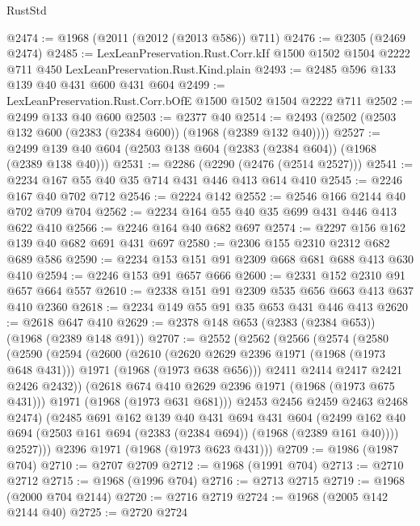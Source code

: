 \begin{lexlean}{RustStd}
\begin{coremodule}
{\begin{coremodule}
{{{{{@2474 := @1968 (@2011 (@2012 (@2013 @586)) @711)
@2476 := @2305 (@2469 @2474)
@2485 := LexLeanPreservation.Rust.Corr.kIf
    @1500
    @1502
    @1504
    @2222
    @711
    @450
    LexLeanPreservation.Rust.Kind.plain
@2493 := @2485 @596 @133 @139 @40 @431 @600 @431 @604
@2499 := LexLeanPreservation.Rust.Corr.bOfE @1500 @1502 @1504 @2222 @711
@2502 := @2499 @133 @40 @600
@2503 := @2377 @40
@2514 := @2493 (@2502 (@2503 @132 @600 (@2383 (@2384 @600)) (@1968 (@2389 @132 @40))))
@2527 := @2499 @139 @40 @604 (@2503 @138 @604 (@2383 (@2384 @604)) (@1968 (@2389 @138 @40)))
@2531 := @2286 (@2290 (@2476 (@2514 @2527)))
@2541 := @2234 @167 @55 @40 @35 @714 @431 @446 @413 @614 @410
@2545 := @2246 @167 @40 @702 @712
@2546 := @2224 @142
@2552 := @2546 @166 @2144 @40 @702 @709 @704
@2562 := @2234 @164 @55 @40 @35 @699 @431 @446 @413 @622 @410
@2566 := @2246 @164 @40 @682 @697
@2574 := @2297 @156 @162 @139 @40 @682 @691 @431 @697
@2580 := @2306 @155 @2310 @2312 @682 @689 @586
@2590 := @2234 @153 @151 @91 @2309 @668 @681 @688 @413 @630 @410
@2594 := @2246 @153 @91 @657 @666
@2600 := @2331 @152 @2310 @91 @657 @664 @557
@2610 := @2338 @151 @91 @2309 @535 @656 @663 @413 @637 @410 @2360
@2618 := @2234 @149 @55 @91 @35 @653 @431 @446 @413
@2620 := @2618 @647 @410
@2629 := @2378 @148 @653 (@2383 (@2384 @653)) (@1968 (@2389 @148 @91))
@2707 := @2552
    (@2562
      (@2566
        (@2574
          (@2580
            (@2590
              (@2594
                (@2600
                  (@2610
                    (@2620 @2629 @2396 @1971 (@1968 (@1973 @648 @431)))
                    @1971
                    (@1968 (@1973 @638 @656)))
                  @2411
                  @2414
                  @2417
                  @2421
                  @2426
                  @2432))
              (@2618 @674 @410 @2629 @2396 @1971 (@1968 (@1973 @675 @431)))
              @1971
              (@1968 (@1973 @631 @681)))
            @2453
            @2456
            @2459
            @2463
            @2468
            @2474)
          (@2485
            @691
            @162
            @139
            @40
            @431
            @694
            @431
            @604
            (@2499 @162 @40 @694 (@2503 @161 @694 (@2383 (@2384 @694)) (@1968 (@2389 @161 @40))))
            @2527)))
      @2396
      @1971
      (@1968 (@1973 @623 @431)))
@2709 := @1986 (@1987 @704)
@2710 := @2707 @2709
@2712 := @1968 (@1991 @704)
@2713 := @2710 @2712
@2715 := @1968 (@1996 @704)
@2716 := @2713 @2715
@2719 := @1968 (@2000 @704 @2144)
@2720 := @2716 @2719
@2724 := @1968 (@2005 @142 @2144 @40)
@2725 := @2720 @2724
}}}}}
\end{coremodule}}
\end{coremodule}
\end{lexlean}
